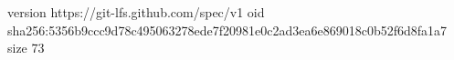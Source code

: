 version https://git-lfs.github.com/spec/v1
oid sha256:5356b9ccc9d78c495063278ede7f20981e0c2ad3ea6e869018c0b52f6d8fa1a7
size 73
